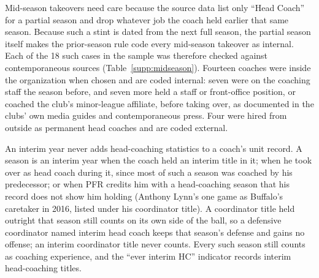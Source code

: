 \documentclass[12pt,USenglish]{article}
\begin{document}
Mid-season takeovers need care because the source data list only ``Head Coach'' for a partial
season and drop whatever job the coach held earlier that same season. Because such a stint is
dated from the next full season, the partial season itself makes the prior-season rule code
every mid-season takeover as internal. Each of the 18 such cases in the sample was therefore
checked against contemporaneous sources (Table~\ref{supp:midseason}). Fourteen coaches were
inside the organization when chosen and are coded internal: seven were on the coaching staff
the season before, and seven more held a staff or front-office position, or coached the club's
minor-league affiliate, before taking over, as documented in the clubs' own media guides and
contemporaneous press. Four were hired from outside as permanent head coaches and are coded
external.

An interim year never adds head-coaching statistics to a coach's unit record. A season is an
interim year when the coach held an interim title in it; when he took over as head coach
during it, since most of such a season was coached by his predecessor; or when PFR credits
him with a head-coaching season that his record does not show him holding (Anthony Lynn's
one game as Buffalo's caretaker in 2016, listed under his coordinator title). A coordinator title held outright
that season still counts on its own side of the ball, so a defensive coordinator named interim
head coach keeps that season's defense and gains no offense; an interim coordinator title never
counts. Every such season still counts as coaching experience, and the ``ever interim HC''
indicator records interim head-coaching titles.
\end{document}
